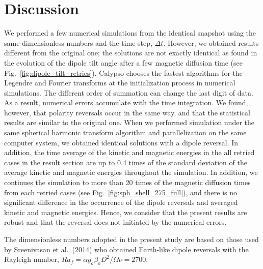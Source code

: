 \section{Discussion}
\label{section:discussion}

{\color{teal}
We performed a few numerical simulations from the identical snapshot using the same dimensionless numbers and the time step, $\Delta t$.
}
However, we obtained results different from the original one; the solutions are not exactly identical
as found in the evolution of the dipole tilt angle after a few magnetic diffusion time (see Fig.~\ref{fig:dipole_tilt_retries}). 
Calypso chooses the fastest algorithms for the Legendre and Fourier transforms at the initialization process in numerical simulations. 
The different order of summation can change the last digit of data. 
As a result, numerical errors accumulate with the time integration. 
We found, however, that polarity reversals occur in the same way, and that the statistical results are similar to the original one.
{\color{blue} 
When we performed simulation under the same spherical harmonic transform algorithm and parallelization on the same computer system, we obtained identical solutions with a dipole reversal. In addition, the time average of the kinetic and magnetic energies in the all retried cases in the result section are up to 0.4 times of the standard deviation of the average kinetic and magnetic energies throughout the simulation. 
{\color{magenta}
In addition, we continues the simulation to more than 20 times of the magnetic diffusion times from each retried cases (see Fig.~\ref{fig:sph_shell_275_full}), and there is no significant difference in the occurrence of the dipole reversals and averaged kinetic and magnetic energies.
}
{\color{teal}
Hence, we consider that the present results are robust and that the reversal does not initiated by the numerical errors.
}
}

{\color{teal}
The dimensionless numbers adopted in the present study are based on those used by Sreenivasan et al.\ (2014) who obtained Earth-like dipole reversals with the Rayleigh number, $Ra_f = \alpha g_o \beta_o D^2 / \Omega \nu = 2700$.
}

